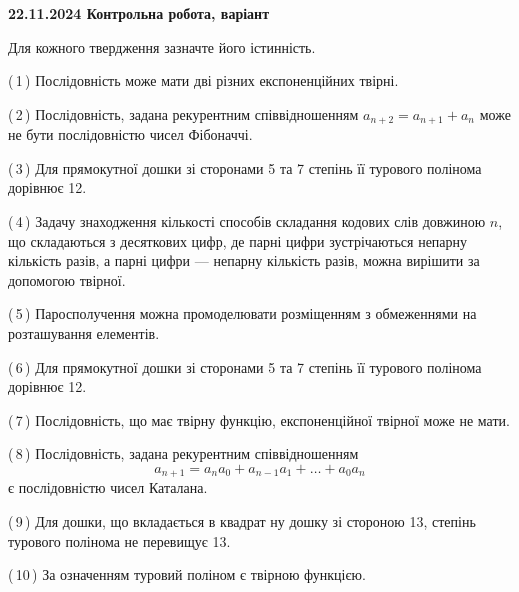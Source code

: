 \documentclass[12pt, ukrainian]{article}
\begin{document}
\begin {large}
\begin {large}
\begin {large}
\begin {large}
\begin {large}
\begin {large}
\begin {large}
\begin {large}
\begin {large}
\begin {large}
\begin {large}
\begin {large}
\begin {large}
\begin {large}
\begin {large}
\begin {large}
\begin {large}
\begin {large}
\begin {large}
\begin {large}
\begin {large}
\begin {large}
\begin {large}
\begin {large}
{\vspace{5mm}
}
\newpage

\begin {large}

\textbf{22.11.2024 Контрольна робота, варіант  }\par


{
Для кожного твердження зазначте його істинність.\par

\vspace{2mm}

(\,1\,) Послідовність може мати дві різних експоненційних твірні.%



(\,2\,) Послідовність, задана рекурентним співвідношенням $a_{n+2}=a_{n+1}+a_{n}$ може не бути послідовністю чисел Фібоначчі.%



(\,3\,) Для прямокутної дошки зі сторонами 5 та 7 степінь її турового полінома дорівнює 12.%



(\,4\,) Задачу знаходження кількості способів складання кодових слів довжиною $n$, що складаються з десяткових цифр, де парні цифри зустрічаються непарну кількість разів, а парні цифри — непарну кількість разів, можна вирішити за допомогою твірної.%



(\,5\,) Паросполучення можна промоделювати розміщенням з обмеженнями на розташування елементів.%



(\,6\,) Для прямокутної дошки зі сторонами 5 та 7 степінь її турового полінома дорівнює 12.%



(\,7\,) Послідовність, що має твірну функцію, експоненційної твірної може не мати.%



(\,8\,) Послідовність, задана рекурентним співвідношенням $$a_{n+1}=a_{n}a_{0}+a_{n-1}a_{1}+\ldots+a_0a_{n}$$ є послідовністю чисел Каталана.%



(\,9\,) Для дошки, що вкладається в квадрат ну дошку зі стороною 13, степінь турового полінома не перевищує 13.%



(\,10\,) За означенням туровий поліном є твірною функцією.%




\vspace{5mm}
}
\newpage


\end{large}
\end{large}
\end{large}
\end{large}
\end{large}
\end{large}
\end{large}
\end{large}
\end{large}
\end{large}
\end{large}
\end{large}
\end{large}
\end{large}
\end{large}
\end{large}
\end{large}
\end{large}
\end{large}
\end{large}
\end{large}
\end{large}
\end{large}
\end{large}
\end{large}
\end{document}
